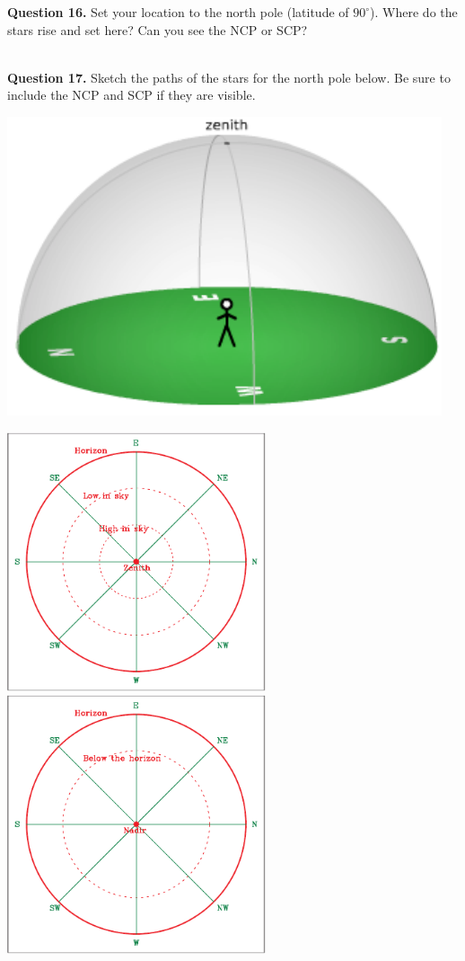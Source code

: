 \documentclass[11pt]{article}
\begin{document}
	\textbf{Question 16.} Set your location to the north pole (latitude of $90^\circ$). Where do the stars rise and set here? Can you see the NCP or SCP?\\
	\vspace*{1.5cm}
	
	\hrulefill\\
	
	\textbf{Question 17.} Sketch the paths of the stars for the north pole below. Be sure to include the NCP and SCP if they are visible. \\
	\vspace*{1.5cm}
		\begin{center}
		\includegraphics{local_sky}
		
		\includegraphics[width=3in]{topsky-crop.pdf}
		\includegraphics[width=3in]{botsky-crop.pdf}
	\end{center}
	
\end{document}
